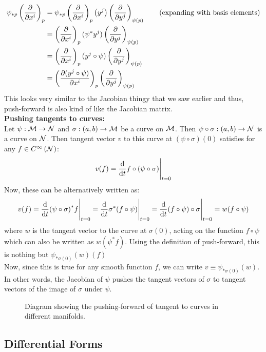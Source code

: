 \begin{align*}
  \psi_{*p}\left( \pdv{x^i} \right)_p &=  \psi_{*p}\left( \pdv{x^i} \right)_p\left( y^j \right)\left( \pdv{y^j} \right)_{\psi(p)}\quad\quad \text{(expanding with basis elements)}\\
  &=\left( \pdv{x^i} \right)_p(\psi^* y^j)\left( \pdv{y^j} \right)_{\psi(p)}\\
  &=\left( \pdv{x^i} \right)_p(y^j\circ \psi)\left( \pdv{y^j} \right)_{\psi(p)}\\
  &=\left( \pdv{(y^j\circ \psi)}{x^i} \right)_p\left( \pdv{y^j} \right)_{\psi(p)}
\end{align*}  
This looks very similar to the Jacobian thingy that we saw earlier and thus, push-forward is also kind of like the Jacobian matrix.\\[0.3cm]
\textbf{Pushing tangents to curves:}\\[0.2cm]
Let $\psi: \mathcal M\rightarrow \mathcal N$ and $\sigma: (a,b)\rightarrow \mathcal M$ be a curve on $\mathcal M$. Then $\psi\circ \sigma: (a,b)\rightarrow \mathcal N$ is a curve on $\mathcal N$. Then tangent vector $v$ to this curve at $(\psi\circ \sigma)(0)$ satisfies for any $f\in C^{\infty}\left(\mathcal N\right)$: 
$$v(f) = \dv{t}f\circ (\psi\circ \sigma)\Bigg|_{t=0}$$
Now, these can be alternatively written as: 
$$v(f) = \dv{t} (\psi\circ \sigma)^* f\Bigg|_{t=0} = \dv{t}\sigma^*(f\circ \psi)\Bigg|_{t=0} =\dv{t}(f\circ \psi)\circ \sigma\Bigg|_{t=0} = w(f\circ\psi)$$
where $w$ is the tangent vector to the curve at $\sigma(0)$, acting on the function $f\circ\psi$ which can also be written as $w(\psi^*f)$. Using the definition of push-forward, this is nothing but $\psi_{*\sigma(0)}(w)(f)$\\
Now, since this is true for any smooth function $f$, we can write $v\equiv \psi_{*\sigma(0)}(w)$. In other words, the Jacobian of $\psi$ pushes the tangent vectors of $\sigma$ to tangent vectors of the image of $\sigma$ under $\psi$. 
\begin{figure}[H]
  \centering
  
  \caption{Diagram showing the pushing-forward of tangent to curves in different manifolds.}
\end{figure}
\subsection{Differential Forms}
